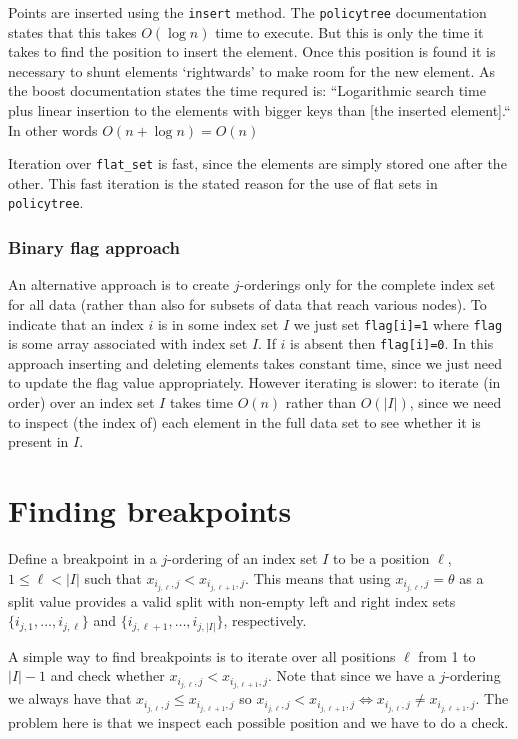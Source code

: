 \documentclass{article}
\newcommand{\policytree}{\texttt{policytree}}
\begin{document}
Points are inserted using the \texttt{insert} method. The
\policytree{} documentation states that this takes $O(\log n)$ time to
execute. But this is only the time it takes to find the position to
insert the element. Once this position is found it is necessary to
shunt elements `rightwards' to make room for the new element. As the
boost documentation states the time requred is: ``Logarithmic search
time plus linear insertion to the elements with bigger keys than [the
inserted element].`` In other words $O(n + \log n) = O(n)$

Iteration over \texttt{flat\_set} is fast, since the elements are
simply stored one after the other. This fast iteration is the stated
reason for the use of flat sets in \policytree.


\subsubsection{Binary flag approach}
\label{sec:binaryflag}

An alternative approach is to create $j$-orderings only for the
complete index set for all data (rather than also for subsets of data
that reach various nodes). To indicate that an index $i$ is in some
index set $I$ we just set \verb+flag[i]=1+ where \verb+flag+ is some
array associated with index set $I$. If $i$ is absent then
\verb+flag[i]=0+. In this approach inserting and deleting elements
takes constant time, since we just need to update the flag value
appropriately. However iterating is slower: to iterate (in order) over
an index set $I$ takes time $O(n)$ rather than $O(|I|)$, since we need
to inspect (the index of) each element in the full data set to see
whether it is present in $I$.

\section{Finding breakpoints}
\label{sec:breakpoints}

Define a breakpoint in a $j$-ordering of an index set $I$ to be a position 
$\ell$, $1 \leq \ell < |I|$ such that $x_{i_{j,\ell},j} <
x_{i_{j,\ell+1},j}$. This means that using $x_{i_{j,\ell},j} =\theta$
as a split value provides a valid split with non-empty left and right
index sets $\{i_{j,1}, \dots, i_{j,\ell}\}$ and $\{i_{j,\ell+1},
\dots, i_{j,|I|}\}$, respectively.

A simple way to find breakpoints is to iterate over all
positions $\ell$ from 1 to $|I|-1$ and check whether
$x_{i_{j,\ell},j} < x_{i_{j,\ell+1},j}$. Note that since we have a
$j$-ordering we always have that $x_{i_{j,\ell},j} \leq
x_{i_{j,\ell+1},j}$ so $x_{i_{j,\ell},j} < x_{i_{j,\ell+1},j}
\Leftrightarrow x_{i_{j,\ell},j} \neq x_{i_{j,\ell+1},j}$.
The problem here is that we inspect each possible position and we have
to do a check.
\end{document}
